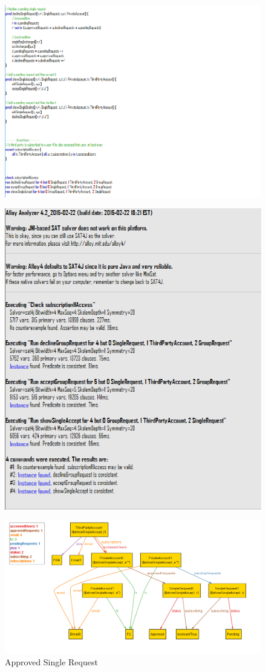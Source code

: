 \documentclass[titlepage]{article}
\begin{document}
		\begin{figure}[H]
			\center
  			\includegraphics[width=0.7\columnwidth]{Alloy/Dynamic5.png}
			\label{fig:dyn5}
		\end{figure}

		\begin{figure}[H]
			\center
  			\includegraphics[width=0.7\columnwidth]{Alloy/Dynamic6.png}
			\label{fig:dyn6}
		\end{figure}

		\begin{figure}[H]
			\center
  			\includegraphics[width=0.7\columnwidth]{Alloy/singleRequest.png}
			\caption{Approved Single Request}
			\label{fig:sing}
		\end{figure}
\end{document}
